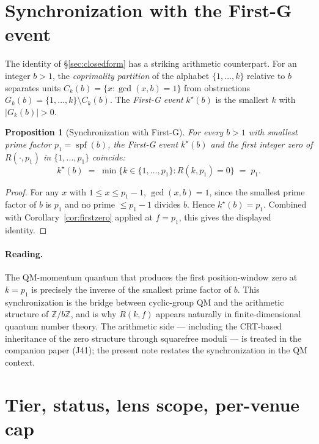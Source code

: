 \documentclass[11pt,reqno]{amsart}
\theoremstyle{plain}
\newtheorem{proposition}[theorem]{Proposition}
\theoremstyle{definition}
\theoremstyle{remark}
\newcommand{\Z}{\mathbb{Z}}
\newcommand{\spf}{\operatorname{spf}}
\begin{document}
\section{Synchronization with the First-G event}
\label{sec:firstg}

The identity of \S\ref{sec:closedform} has a striking arithmetic counterpart. For an
integer $b > 1$, the \emph{coprimality partition} of the alphabet $\{1,\dots,k\}$
relative to $b$ separates units $C_{k}(b) = \{x : \gcd(x,b) = 1\}$ from obstructions
$G_{k}(b) = \{1,\dots,k\}\setminus C_{k}(b)$. The \emph{First-G event} $k^{\star}(b)$ is
the smallest $k$ with $|G_{k}(b)| > 0$.

\begin{proposition}[Synchronization with First-G]
\label{prop:firstg}
For every $b > 1$ with smallest prime factor $p_{1} = \spf(b)$, the First-G event
$k^{\star}(b)$ and the first integer zero of $R(\cdot,p_{1})$ in $\{1,\dots,p_{1}\}$
coincide:
\[
  k^{\star}(b) \;=\; \min\{k \in \{1,\dots,p_{1}\} : R(k,p_{1}) = 0\} \;=\; p_{1}.
\]
\end{proposition}

\begin{proof}
For any $x$ with $1 \le x \le p_{1} - 1$, $\gcd(x,b) = 1$, since the smallest prime
factor of $b$ is $p_{1}$ and no prime $\le p_{1}-1$ divides $b$. Hence
$k^{\star}(b) = p_{1}$. Combined with Corollary~\ref{cor:firstzero} applied at
$f = p_{1}$, this gives the displayed identity.
\end{proof}

\paragraph{Reading.}
The QM-momentum quantum that produces the first position-window zero at $k = p_{1}$ is
precisely the inverse of the smallest prime factor of $b$. This synchronization is the
bridge between cyclic-group QM and the arithmetic structure of $\Z/b\Z$, and is why
$R(k,f)$ appears naturally in finite-dimensional quantum number theory. The arithmetic
side --- including the CRT-based inheritance of the zero structure through squarefree
moduli --- is treated in the companion paper \cite{SandersGishSincZero} (J41); the
present note restates the synchronization in the QM context.

\section{Tier, status, lens scope, per-venue cap}
\label{sec:tier}
\end{document}
